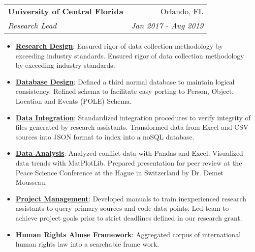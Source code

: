 \documentclass[letterpaper,11pt]{article}
\makeatletter
\newcommand{\resumeItem}[2]{
  \item\small{
    \textbf{#1}{: #2 \vspace{-2pt}}
  }
}
\newcommand{\resumeSubheading}[4]{
  \vspace{-1pt}\item
    \begin{tabular*}{0.97\textwidth}[t]{l@{\extracolsep{\fill}}r}
      \textbf{#1} & #2 \\
      \textit{\small#3} & \textit{\small #4} \\
    \end{tabular*}\vspace{-5pt}
}
\newcommand{\resumeSubSubheading}[2]{
    \begin{tabular*}{0.97\textwidth}{l@{\extracolsep{\fill}}r}
      \textit{\small#1} & \textit{\small #2} \\
    \end{tabular*}\vspace{-5pt}
}
\newcommand{\resumeSubHeadingListEnd}{\end{itemize}}
\newcommand{\resumeItemListStart}{\begin{itemize}}
\newcommand{\resumeItemListEnd}{\end{itemize}\vspace{-5pt}}
\makeatother
\begin{document}

    \resumeSubheading
      {\href{https://cv.jnapolitano.io/parts/resume/work-history/docs/ucf.html}{University of Central Florida}}{Orlando, FL}
      {Research Lead}{Jan 2017 - Aug 2019}
      \resumeItemListStart
        \resumeItem{\href{https://cv.jnapolitano.io/parts/analysis/political-analysis/terrorism-conflict/project-turkish-kurdish/pdf.htm}{Research Design}}
          {Ensured rigor of data collection methodology by exceeding industry standards.  Ensured rigor of data collection methodology by exceeding industry standards.}
        \resumeItem{\href{https://cv.jnapolitano.io/parts/analysis/political-analysis/terrorism-conflict/project-turkish-kurdish/database_schema.html}{Database Design}}
          {Defined a third normal database to maintain logical consistency.  Refined schema to facilitate easy porting to Person, Object, Location and Events (POLE) Schema.}
        \resumeItem{\href{https://cv.jnapolitano.io/parts/data/data-integration/index.html}{Data Integration}}
          {Standardized integration procedures to verify integrity of files generated by research assistants. Transformed data from Excel and CSV sources into JSON format to index into a noSQL database.}
        \resumeItem{\href{https://cv.jnapolitano.io/parts/analysis/political-analysis/terrorism-conflict/project-turkish-kurdish/analysis.html}{Data Analysis}}
          {Analyzed conflict data with Pandas and Excel.  Visualized data trends with MatPlotLib.  Prepared presentation for peer review at the Peace Science Conference at the Hague in Switzerland by Dr. Demet Mousseau.}
        \resumeItem{\href{https://cv.jnapolitano.io/parts/analysis/political-analysis/terrorism-conflict/project-turkish-kurdish/pdf.html}{Project Management}}
          {Developed manuals to train inexperienced research assistants to query primary sources and code data points.  Led team to achieve project goals prior to strict deadlines defined in our research grant.}
        \resumeItem{\href{https://cv.jnapolitano.io/parts/analysis/political-analysis/human-rights-law/index.html}{Human Rights Abuse Framework}}
          {Aggregated corpus of international human rights law into a searchable frame work.}
    \resumeItemListEnd
\end{document}

